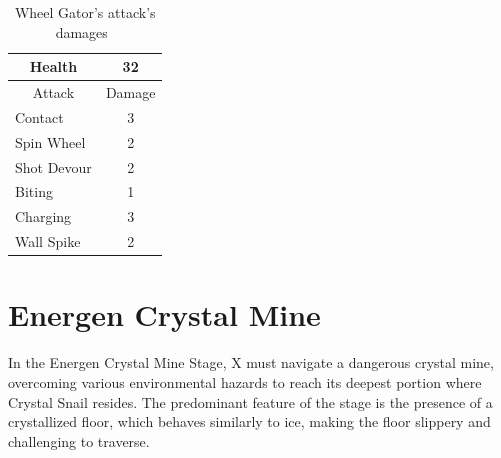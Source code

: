 \begin{table}[htp]
	\centering
	\begin{tabular}[h]{l c}
		\toprule
		\multicolumn{1}{c}{Health}  & 32 \\
		\midrule
		\multicolumn{1}{c}{Attack} & \multicolumn{1}{c}{Damage}\\
		Contact & 3 \\
		Spin Wheel & 2\\
		Shot Devour & 2\\
		Biting & 1\\
		Charging& 3\\
		Wall Spike& 2\\
		\bottomrule
	\end{tabular}
	\caption{Wheel Gator's attack's damages~\cite{wiki:Wheel_gator,book:Compendium}}
\end{table}

\section{Energen Crystal Mine}
In the Energen Crystal Mine Stage, X must navigate a dangerous crystal mine, overcoming various environmental hazards to reach its deepest portion where Crystal Snail resides. The predominant feature of the stage is the presence of a crystallized floor, which behaves similarly to ice, making the floor slippery and challenging to traverse.

